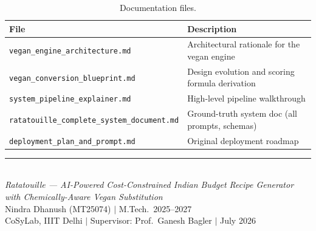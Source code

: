 \documentclass[12pt, a4paper]{article}
\begin{document}
\begin{table}[H]
\centering
\caption{Documentation files.}
\begin{tabularx}{\textwidth}{l X}
\toprule
\textbf{File} & \textbf{Description} \\
\midrule
\texttt{vegan\_engine\_architecture.md}      & Architectural rationale for the vegan engine \\
\texttt{vegan\_conversion\_blueprint.md}     & Design evolution and scoring formula derivation \\
\texttt{system\_pipeline\_explainer.md}      & High-level pipeline walkthrough \\
\texttt{ratatouille\_complete\_system\_document.md} & Ground-truth system doc (all prompts, schemas) \\
\texttt{deployment\_plan\_and\_prompt.md}    & Original deployment roadmap \\
\bottomrule
\end{tabularx}
\end{table}

\vfill
\begin{center}
\rule{0.6\textwidth}{0.4pt}\\[6pt]
{\small
\textit{Ratatouille --- AI-Powered Cost-Constrained Indian Budget Recipe Generator with Chemically-Aware Vegan Substitution}\\[4pt]
Nindra Dhanush (MT25074) $|$ M.Tech.\ 2025--2027\\
CoSyLab, IIIT Delhi $|$ Supervisor: Prof.\ Ganesh Bagler $|$ July 2026
}
\end{center}
\end{document}
